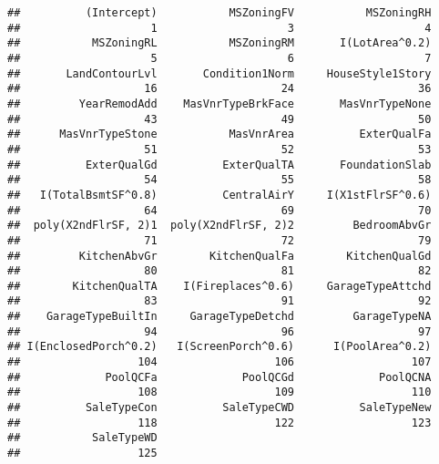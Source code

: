 \documentclass[]{article}
\begin{document}
\begin{verbatim}
##          (Intercept)           MSZoningFV           MSZoningRH 
##                    1                    3                    4 
##           MSZoningRL           MSZoningRM       I(LotArea^0.2) 
##                    5                    6                    7 
##       LandContourLvl       Condition1Norm     HouseStyle1Story 
##                   16                   24                   36 
##         YearRemodAdd    MasVnrTypeBrkFace       MasVnrTypeNone 
##                   43                   49                   50 
##      MasVnrTypeStone           MasVnrArea          ExterQualFa 
##                   51                   52                   53 
##          ExterQualGd          ExterQualTA       FoundationSlab 
##                   54                   55                   58 
##   I(TotalBsmtSF^0.8)          CentralAirY     I(X1stFlrSF^0.6) 
##                   64                   69                   70 
##  poly(X2ndFlrSF, 2)1  poly(X2ndFlrSF, 2)2         BedroomAbvGr 
##                   71                   72                   79 
##         KitchenAbvGr        KitchenQualFa        KitchenQualGd 
##                   80                   81                   82 
##        KitchenQualTA    I(Fireplaces^0.6)     GarageTypeAttchd 
##                   83                   91                   92 
##    GarageTypeBuiltIn     GarageTypeDetchd         GarageTypeNA 
##                   94                   96                   97 
## I(EnclosedPorch^0.2)   I(ScreenPorch^0.6)      I(PoolArea^0.2) 
##                  104                  106                  107 
##             PoolQCFa             PoolQCGd             PoolQCNA 
##                  108                  109                  110 
##          SaleTypeCon          SaleTypeCWD          SaleTypeNew 
##                  118                  122                  123 
##           SaleTypeWD 
##                  125
\end{verbatim}
\end{document}
